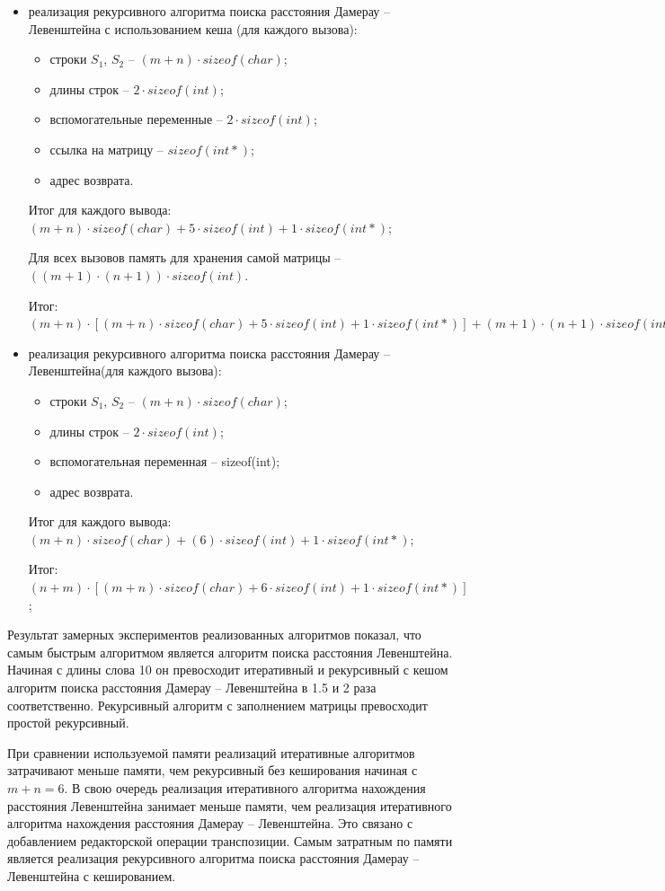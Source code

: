 \begin{itemize}
	\item реализация рекурсивного алгоритма поиска расстояния Дамерау -- Левенштейна с использованием кеша (для каждого вызова):
	\begin{itemize}
		\item строки $S_{1}$, $S_{2}$ -- $(m + n) \cdot sizeof(char)$;
		\item длины строк -- $2 \cdot sizeof(int)$;
		\item вспомогательные переменные --  $2 \cdot sizeof(int)$;
		\item ссылка на матрицу -- $sizeof(int*)$;
		\item адрес возврата.
	\end{itemize}
Итог для каждого вывода: $(m + n) \cdot sizeof(char) + 5 \cdot sizeof(int) + 1 \cdot sizeof(int*)$;
	
Для всех вызовов память для хранения самой матрицы -- $((m + 1) \cdot (n + 1)) \cdot sizeof(int)$.
	
Итог: $(m + n) \cdot [(m + n) \cdot sizeof(char) + 5 \cdot sizeof(int) + 1 \cdot sizeof(int*)] +(m + 1) \cdot (n + 1) \cdot sizeof(int);$
	
	\item реализация рекурсивного алгоритма поиска расстояния Дамерау -- Левенштейна(для каждого вызова):\begin{itemize}
		\item строки $S_{1}$, $S_{2}$ -- $(m + n) \cdot sizeof(char)$;
		\item длины строк -- $2 \cdot sizeof(int)$;
		\item вспомогательная переменная -- sizeof(int);
		\item адрес возврата.
	\end{itemize}

Итог для каждого вывода: $(m + n) \cdot sizeof(char) + (6) \cdot sizeof(int) + 1 \cdot sizeof(int*)$;

Итог: $(n + m) \cdot [(m + n) \cdot sizeof(char) + 6 \cdot sizeof(int) + 1 \cdot sizeof(int*)]$;

\end{itemize}

Результат замерных экспериментов реализованных алгоритмов показал, что самым быстрым алгоритмом является алгоритм поиска расстояния Левенштейна. Начиная с длины слова 10 он превосходит итеративный и рекурсивный с кешом алгоритм поиска расстояния Дамерау -- Левенштейна в 1.5 и 2 раза соответственно. Рекурсивный алгоритм с заполнением матрицы превосходит простой рекурсивный.

При сравнении используемой памяти реализаций итеративные алгоритмов затрачивают меньше памяти, чем рекурсивный без кеширования начиная с $m + n = 6$. В свою очередь реализация итеративного алгоритма нахождения расстояния Левенштейна занимает меньше памяти, чем  реализация итеративного алгоритма нахождения расстояния Дамерау -- Левенштейна. Это связано с добавлением редакторской операции транспозиции. Самым затратным по памяти является реализация рекурсивного алгоритма поиска расстояния Дамерау -- Левенштейна с кешированием.
